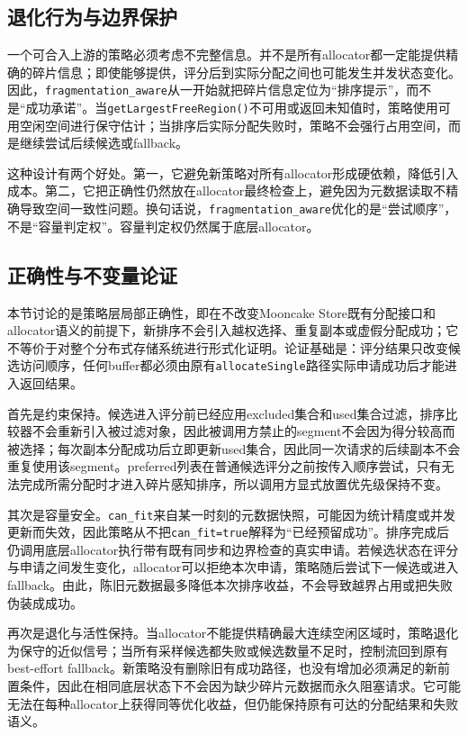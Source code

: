 \documentclass[UTF8,zihao=-4,a4paper]{ctexart}
\newcommand{\artifact}[1]{\texttt{#1}}
\newcommand{\strategy}{\texttt{fragmentation\_aware}}
\begin{document}
\subsection{退化行为与边界保护}

一个可合入上游的策略必须考虑不完整信息。并不是所有allocator都一定能提供精确的碎片信息；即使能够提供，评分后到实际分配之间也可能发生并发状态变化。因此，\strategy{}从一开始就把碎片信息定位为“排序提示”，而不是“成功承诺”。当\artifact{getLargestFreeRegion()}不可用或返回未知值时，策略使用可用空闲空间进行保守估计；当排序后实际分配失败时，策略不会强行占用空间，而是继续尝试后续候选或fallback。

这种设计有两个好处。第一，它避免新策略对所有allocator形成硬依赖，降低引入成本。第二，它把正确性仍然放在allocator最终检查上，避免因为元数据读取不精确导致空间一致性问题。换句话说，\strategy{}优化的是“尝试顺序”，不是“容量判定权”。容量判定权仍然属于底层allocator。

\subsection{正确性与不变量论证}

本节讨论的是策略层局部正确性，即在不改变Mooncake Store既有分配接口和allocator语义的前提下，新排序不会引入越权选择、重复副本或虚假分配成功；它不等价于对整个分布式存储系统进行形式化证明。论证基础是：评分结果只改变候选访问顺序，任何buffer都必须由原有\artifact{allocateSingle}路径实际申请成功后才能进入返回结果。

首先是约束保持。候选进入评分前已经应用excluded集合和used集合过滤，排序比较器不会重新引入被过滤对象，因此被调用方禁止的segment不会因为得分较高而被选择；每次副本分配成功后立即更新used集合，因此同一次请求的后续副本不会重复使用该segment。preferred列表在普通候选评分之前按传入顺序尝试，只有无法完成所需分配时才进入碎片感知排序，所以调用方显式放置优先级保持不变。

其次是容量安全。\artifact{can\_fit}来自某一时刻的元数据快照，可能因为统计精度或并发更新而失效，因此策略从不把\artifact{can\_fit=true}解释为“已经预留成功”。排序完成后仍调用底层allocator执行带有既有同步和边界检查的真实申请。若候选状态在评分与申请之间发生变化，allocator可以拒绝本次申请，策略随后尝试下一候选或进入fallback。由此，陈旧元数据最多降低本次排序收益，不会导致越界占用或把失败伪装成成功。

再次是退化与活性保持。当allocator不能提供精确最大连续空闲区域时，策略退化为保守的近似信号；当所有采样候选都失败或候选数量不足时，控制流回到原有best-effort fallback。新策略没有删除旧有成功路径，也没有增加必须满足的新前置条件，因此在相同底层状态下不会因为缺少碎片元数据而永久阻塞请求。它可能无法在每种allocator上获得同等优化收益，但仍能保持原有可达的分配结果和失败语义。
\end{document}
